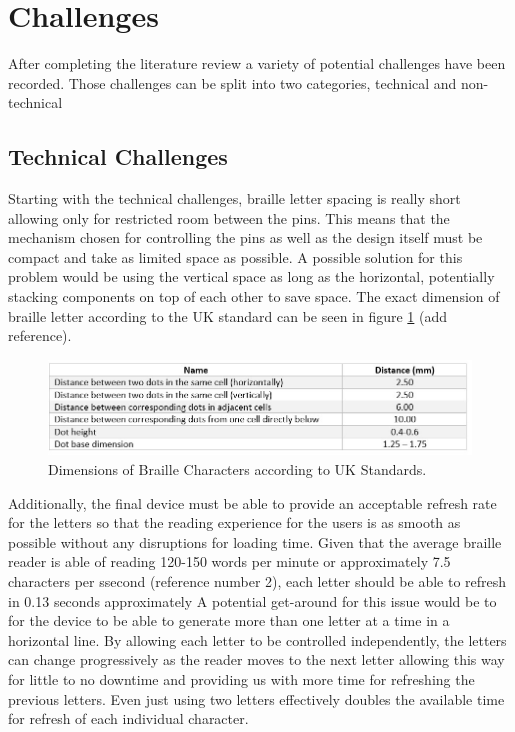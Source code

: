 \section{Challenges}
After completing the literature review a variety of potential challenges have been recorded.
Those challenges can be split into two categories, technical and non-technical 

\subsection{Technical Challenges}
Starting with the technical challenges, braille letter spacing is really short allowing only for restricted room between the pins.
This means that the mechanism chosen for controlling the pins as well as the design itself must be compact and take as limited space as possible.
A possible solution for this problem would be using the vertical space as long as the horizontal, potentially stacking components on top of each other to save space. The exact dimension of braille letter according to the UK standard can be seen in figure \ref{fig:BrailleTable} (add reference).
\begin{figure}[h]
\centering
    \includegraphics[width=\textwidth]{figures/BrailleDistance Table.jpg}
\caption[Braille Distances Table]{Dimensions of Braille Characters according to UK Standards.}
\label{fig:BrailleTable}
\end{figure}

Additionally, the final device must be able to provide an acceptable refresh rate for the letters so that the reading experience for the users is as smooth as possible without any disruptions for loading time. Given that the average braille reader is able of reading 120-150 words per minute or approximately 7.5 characters per ssecond (reference number 2), each letter should be able to refresh in 0.13 seconds approximately
A potential get-around for this issue would be to for the device to be able to generate more than one letter at a time in a horizontal line.
By allowing each letter to be controlled independently, the letters can change progressively as the reader moves to the next letter allowing this way for little to no downtime and providing us with more time for refreshing the previous letters. Even just using two letters effectively doubles the available time for refresh of each individual character.
 

